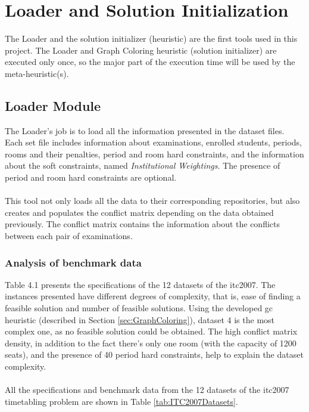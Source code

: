 \chapter{Loader and Solution Initialization}
\label{chap:SolutionInit}
\thispagestyle{plain}

The Loader and the solution initializer (heuristic) are the first tools used in this project. The Loader and Graph Coloring heuristic (solution initializer) are executed only once, so the major part of the execution time will be used by the meta-heuristic(s).

\section{Loader Module}
\label{sec:Loader}

The Loader's job is to load all the information presented in the dataset files. Each set file includes information about examinations, enrolled students, periods, rooms and their penalties, period and room hard constraints, and the information about the soft constraints, named \textit{Institutional Weightings}. The presence of period and room hard constraints are optional.\\
\\
This tool not only loads all the data to their corresponding repositories, but also creates and populates the conflict matrix depending on the data obtained previously. The conflict matrix contains the information about the conflicts between each pair of examinations.

\subsection{Analysis of benchmark data}

Table 4.1 presents the specifications of the 12 datasets of the \gls{itc2007}. The instances presented have different degrees of complexity, that is, ease of finding a feasible solution and number of feasible solutions. Using the developed \gls{gc} heuristic (described in Section \ref{sec:GraphColoring}), dataset 4 is the most complex one, as no feasible solution could be obtained. The high conflict matrix density, in addition to the fact there's only one room (with the capacity of 1200 seats), and the presence of 40 period hard constraints, help to explain the dataset complexity.\\
\\
All the specifications and benchmark data from the 12 datasets of the \gls{itc2007} timetabling problem are shown in Table \ref{tab:ITC2007Datasets}.

